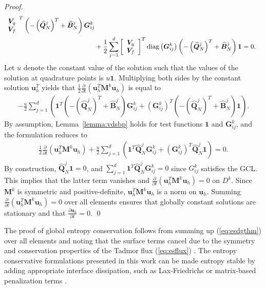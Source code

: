 \documentclass{svjour3}                     %
\renewcommand{\hat}{\widehat}
\newcommand{\diag}[1]{{\rm diag}\LRp{#1}}
\newcommand{\pd}[2]{\frac{\partial#1}{\partial#2}}
\newcommand{\LRp}[1]{\left( #1 \right)}
\newcommand{\LRs}[1]{\left[ #1 \right]}
\begin{document}
\begin{proof}
\begin{align*}
{\begin{array}{cc}
\bm{V}_q \\
\bm{V}_f\end{array}}^T \LRp{-\LRp{\hat{\bm{Q}}^j_N}^T +\hat{\bm{B}}^j_N}\bm{G}^k_{ij}\\
&+ \frac{1}{2} \sum_{j=1}^d \LRs{\begin{array}{cc}
\bm{V}_q \\
\bm{V}_f\end{array}}^T\diag{\bm{G}^k_{ij}} \LRp{-\LRp{\hat{\bm{Q}}^j_N}^T +\hat{\bm{B}}^j_N}\bm{1} = 0.
\end{align*}
Let $u$ denote the constant value of the solution such that the values of the solution at quadrature points is $u\bm{1}$.  Multiplying both sides by the constant solution $\bm{u}_h^T$ yields that $\frac{1}{2}\pd{}{t}\LRp{\bm{u}_h^T\bm{M}^k\bm{u}_h}$ is equal to 
\begin{align*}
-\frac{u}{2} \sum_{j=1}^d \LRp{\bm{1}^T \LRp{-\LRp{\hat{\bm{Q}}^j_N}^T +\hat{\bm{B}}^j_N}\bm{G}^k_{ij}
+\LRp{\bm{G}^k_{ij}}^T \LRp{-\LRp{\hat{\bm{Q}}^j_N}^T +\hat{\bm{B}}^j_N}\bm{1}}.%
\end{align*}
By assumption, Lemma~\ref{lemma:vdsbp} holds for test functions $\bm{1}$ and $\bm{G}^k_{ij}$, and the formulation reduces to
\begin{align*}
\frac{1}{2}\pd{}{t}\LRp{\bm{u}_h^T\bm{M}^k\bm{u}_h} + \frac{u}{2} \sum_{j=1}^d \LRp{\bm{1}^T \hat{\bm{Q}}^j_N\bm{G}^k_{ij}
+\LRp{\bm{G}^k_{ij}}^T \hat{\bm{Q}}^j_N\bm{1}} = 0.
\end{align*}
By construction, $\hat{\bm{Q}}^j_N\bm{1} = 0$, and $\sum_{j=1}^d \bm{1}^T \hat{\bm{Q}}^j_N\bm{G}^k_{ij} = 0$ since $G^k_{ij}$ satisfies the GCL.  This implies that the latter term vanishes and $\pd{}{t}\LRp{\bm{u}_h^T\bm{M}^k\bm{u}_h} = 0$ on $D^k$.  Since $\bm{M}^k$ is symmetric and positive-definite, $\bm{u}_h^T\bm{M}^k\bm{u}_h$ is a norm on $\bm{u}_h$.  Summing $\pd{}{t}\LRp{\bm{u}_h^T\bm{M}^k\bm{u}_h} = 0$ over all elements ensures that globally constant solutions are stationary and that $\pd{\bm{u}_h}{t} = 0$.  
\qed\end{proof}

The proof of global entropy conservation follows from summing up (\ref{eq:esdgthm}) over all elements and noting that the surface terms cancel due to the symmetry and conservation properties of the Tadmor flux (\ref{eq:esflux}) \cite{chan2017discretely}.  The entropy conservative formulations presented in this work can be made entropy stable by adding appropriate interface dissipation, such as Lax-Friedrichs or matrix-based penalization terms \cite{winters2017uniquely, chen2017entropy, chan2017discretely}.  
\end{document}
